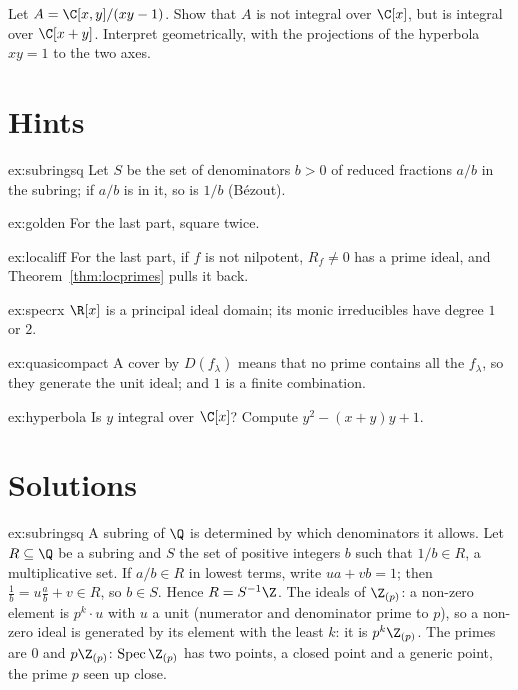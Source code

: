 \begin{exercise}[$\star\star$]\label{ex:hyperbola}
Let $A=\C[x,y]/(xy-1)$. Show that $A$ is not integral over $\C[x]$, but is integral over $\C[x+y]$. Interpret geometrically, with the projections of the hyperbola $xy=1$ to the two axes.
\end{exercise}

\section{Hints}

\begin{hint}{ex:subringsq}
Let $S$ be the set of denominators $b>0$ of reduced fractions $a/b$ in the subring; if $a/b$ is in it, so is $1/b$ (Bézout).
\end{hint}

\begin{hint}{ex:golden}
For the last part, square twice.
\end{hint}

\begin{hint}{ex:localiff}
For the last part, if $f$ is not nilpotent, $R_f\neq0$ has a prime ideal, and Theorem~\ref{thm:locprimes} pulls it back.
\end{hint}

\begin{hint}{ex:specrx}
$\R[x]$ is a principal ideal domain; its monic irreducibles have degree $1$ or $2$.
\end{hint}

\begin{hint}{ex:quasicompact}
A cover by $D(f_\lambda)$ means that no prime contains all the $f_\lambda$, so they generate the unit ideal; and $1$ is a finite combination.
\end{hint}

\begin{hint}{ex:hyperbola}
Is $y$ integral over $\C[x]$? Compute $y^2-(x+y)y+1$.
\end{hint}

\section{Solutions}

\begin{solution}{ex:subringsq}
\idea A subring of $\Q$ is determined by which denominators it allows.
\writeup Let $R\subseteq\Q$ be a subring and $S$ the set of positive integers $b$ such that $1/b\in R$, a multiplicative set. If $a/b\in R$ in lowest terms, write $ua+vb=1$; then $\frac1b=u\frac ab+v\in R$, so $b\in S$. Hence $R=S^{-1}\Z$.
The ideals of $\Z_{(p)}$: a non-zero element is $p^k\cdot u$ with $u$ a unit (numerator and denominator prime to $p$), so a non-zero ideal is generated by its element with the least $k$: it is $p^k\Z_{(p)}$. The primes are $0$ and
$p\Z_{(p)}$: $\operatorname{Spec}\Z_{(p)}$ has two points, a closed point and a generic point, the prime $p$ seen up close.
\end{solution}

